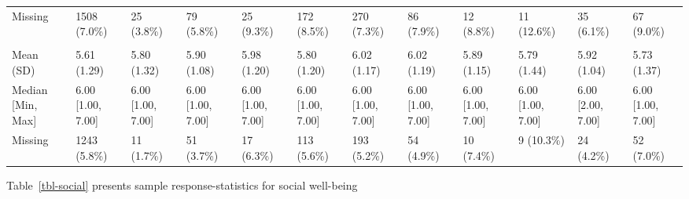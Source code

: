 \documentclass[
  single column]{article}
\begin{document}
\begin{landscape}
\begin{longtable}[t]{llllllllllll}
\hspace{1em}Missing & 1508 (7.0\%) & 25 (3.8\%) & 79 (5.8\%) & 25 (9.3\%) & 172 (8.5\%) & 270 (7.3\%) & 86 (7.9\%) & 12 (8.8\%) & 11 (12.6\%) & 35 (6.1\%) & 67 (9.0\%)\\
\addlinespace[0.3em]
\multicolumn{12}{l}{\textbf{Meaning: Sense}}\\
\hspace{1em}Mean (SD) & 5.61 (1.29) & 5.80 (1.32) & 5.90 (1.08) & 5.98 (1.20) & 5.80 (1.20) & 6.02 (1.17) & 6.02 (1.19) & 5.89 (1.15) & 5.79 (1.44) & 5.92 (1.04) & 5.73 (1.37)\\
\hspace{1em}Median [Min, Max] & 6.00 [1.00, 7.00] & 6.00 [1.00, 7.00] & 6.00 [1.00, 7.00] & 6.00 [1.00, 7.00] & 6.00 [1.00, 7.00] & 6.00 [1.00, 7.00] & 6.00 [1.00, 7.00] & 6.00 [1.00, 7.00] & 6.00 [1.00, 7.00] & 6.00 [2.00, 7.00] & 6.00 [1.00, 7.00]\\
\hspace{1em}Missing & 1243 (5.8\%) & 11 (1.7\%) & 51 (3.7\%) & 17 (6.3\%) & 113 (5.6\%) & 193 (5.2\%) & 54 (4.9\%) & 10 (7.4\%) & 9 (10.3\%) & 24 (4.2\%) & 52 (7.0\%)\\*

\end{longtable}

\endgroup{}


\end{landscape}

\newpage{}

\newpage{}

Table~\ref{tbl-social} presents sample response-statistics for social
well-being
\end{document}
